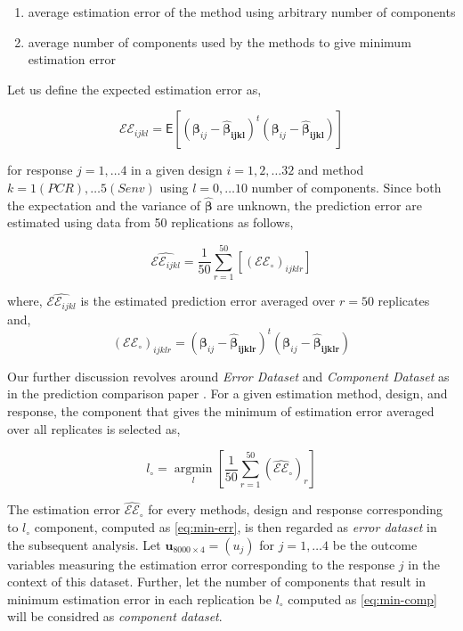 \documentclass[12pt,3p,authoryear]{elsarticle}
\providecommand{\tightlist}{%
  \setlength{\itemsep}{0pt}\setlength{\parskip}{0pt}}
\begin{document}
\begin{enumerate}
\def\labelenumi{\alph{enumi})}
\tightlist
\item
  average estimation error of the method using arbitrary number of
  components
\item
  average number of components used by the methods to give minimum
  estimation error
\end{enumerate}

Let us define the expected estimation error as,

\begin{equation}
\mathcal{EE}_{ijkl} =
  \mathsf{E}{\left[\left(\boldsymbol{\beta}_{ij} -
  \boldsymbol{\hat{\beta}_{ijkl}}\right)^t
  \left(\boldsymbol{\beta}_{ij} - \boldsymbol{\hat{\beta}_{ijkl}}\right)\right]}
\label{eq:est-error}
\end{equation}

for response \(j = 1, \ldots 4\) in a given design \(i=1, 2, \ldots 32\)
and method \(k=1(PCR), \ldots 5(Senv)\) using \(l=0, \ldots 10\) number
of components. Since both the expectation and the variance of
\(\hat{\boldsymbol{\beta}}\) are unknown, the prediction error are
estimated using data from 50 replications as follows,

\begin{equation}
\widehat{\mathcal{EE}_{ijkl}} =
  \frac{1}{50}\sum_{r=1}^{50}{\left[
  \left(\mathcal{EE}_\circ\right)_{ijklr}
  \right]}
\label{eq:estimated-est-error}
\end{equation}

where, \(\widehat{\mathcal{EE}_{ijkl}}\) is the estimated prediction
error averaged over \(r=50\) replicates and,
\[\left(\mathcal{EE}_\circ\right)_{ijklr} = \left(\boldsymbol{\beta}_{ij} -\boldsymbol{\hat{\beta}_{ijklr}}\right)^t\left(\boldsymbol{\beta}_{ij} - \boldsymbol{\hat{\beta}_{ijklr}}\right)\]

Our further discussion revolves around \emph{Error Dataset} and
\emph{Component Dataset} as in the prediction comparison paper
\citet{rimal2019pred}. For a given estimation method, design, and
response, the component that gives the minimum of estimation error
averaged over all replicates is selected as,

\begin{equation}
  l_\circ = \operatorname*{argmin}_{l}\left[\frac{1}{50}\sum_{r=1}^{50}{\left(\widehat{\mathcal{EE}}_\circ\right)_{r}}\right]
  \label{eq:min-err}
\end{equation}

The estimation error \(\widehat{\mathcal{EE}}_\circ\) for every methods,
design and response corresponding to \(l_\circ\) component, computed as
\eqref{eq:min-err}, is then regarded as \emph{error dataset} in the
subsequent analysis. Let \(\mathbf{u}_{8000\times4}=(u_j)\) for
\(j = 1, \ldots 4\) be the outcome variables measuring the estimation
error corresponding to the response \(j\) in the context of this
dataset. Further, let the number of components that result in minimum
estimation error in each replication be \(l_\circ\) computed as
\eqref{eq:min-comp} will be considred as \emph{component dataset}.
\end{document}
